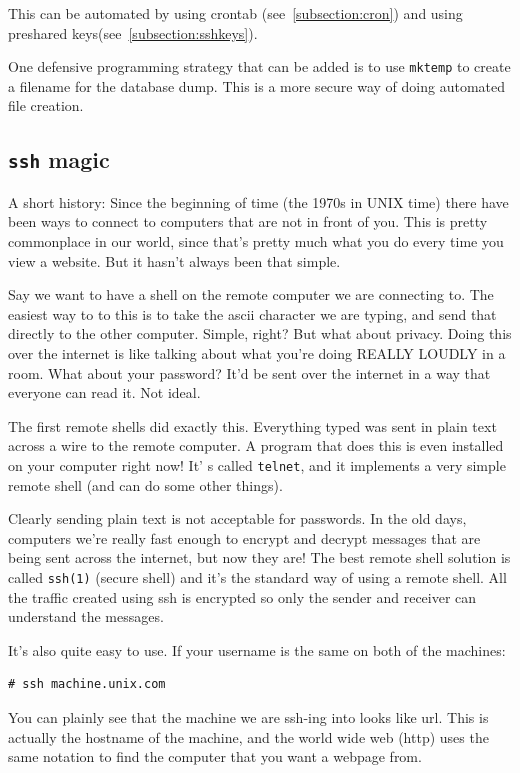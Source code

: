 This can be automated by using crontab (see~\ref{subsection:cron}) and
using preshared keys(see~\ref{subsection:sshkeys}). 

One defensive programming strategy that can be added is to use {\tt mktemp} to
create a filename for the database dump. This is a more secure way of doing
automated file creation.  

\subsection {{\tt ssh} magic}

A short history: Since the beginning of time (the 1970s in UNIX time) there have been ways
to connect to computers that are not in front of you. This is pretty commonplace in our world, 
since that's pretty much what you do every time you view a website. But it hasn't 
always been that simple.

Say we want to have a shell on the remote computer we are connecting to. The easiest way 
to to this is to take the ascii character we are typing, and send that directly to the other
computer. Simple, right? But what about privacy. Doing this over the internet is like talking
about what you're doing REALLY LOUDLY in a room. What about your password? It'd be sent over the 
internet in a way that everyone can read it. Not ideal. 

The first remote shells did exactly this. Everything typed was sent in plain text across a wire to 
the remote computer. A program that does this is even installed on your computer right now! It' s
called {\tt telnet}, and it implements a very simple remote shell (and can do some other things).

Clearly sending plain text is not acceptable for passwords. In the old days, computers we're
really fast enough to encrypt and decrypt messages that are being sent across the internet,
but now they are! The best remote shell solution is called {\tt ssh(1)} (secure shell) and it's 
the standard way of using a remote shell. All the traffic created using ssh is encrypted so only the 
sender and receiver can understand
the messages. 

It's also quite easy to use. If your username is the same on both of the machines:

\begin{verbatim}
# ssh machine.unix.com
\end{verbatim}    

You can plainly see that the machine we are ssh-ing into looks like url. This is 
actually the hostname of the machine, and the world wide web (http) uses the same
notation to find the computer that you want a webpage from.

